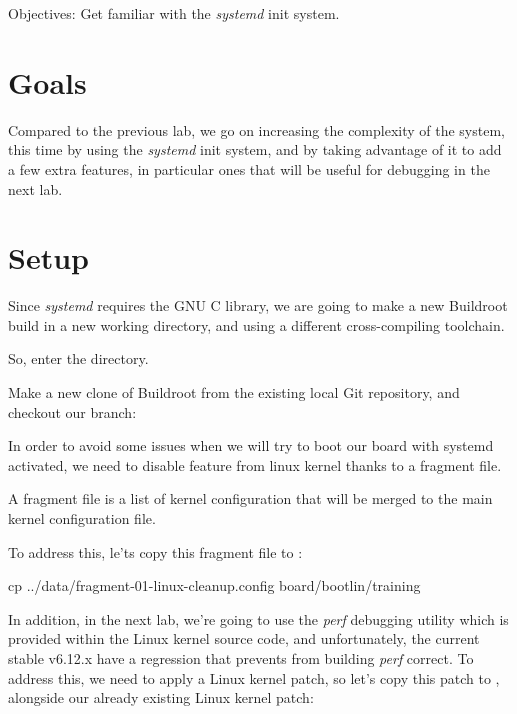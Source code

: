   {Objectives: Get familiar with the {\em systemd} init system.}

\section{Goals}

Compared to the previous lab, we go on increasing the complexity
of the system, this time by using the {\em systemd} init system,
and by taking advantage of it to add a few extra features, in particular
ones that will be useful for debugging in the next lab.

\section{Setup}

Since {\em systemd} requires the GNU C library, we are going
to make a new Buildroot build in a new working directory, and
using a different cross-compiling toolchain.

So, enter the  directory.

Make a new clone of Buildroot from the existing local Git repository,
and checkout our  branch:


\if{}
In order to avoid some issues when we will try to boot our board with
systemd activated, we need to disable  feature from
linux kernel thanks to a fragment file.

A fragment file is a list of kernel configuration that will be merged to the main kernel configuration file.

To address this, le'ts copy this fragment file to :

\begin{bashinput}
cp ../data/fragment-01-linux-cleanup.config board/bootlin/training
\end{bashinput}
\else
In addition, in the next lab, we're going to use the {\em perf}
debugging utility which is provided within the Linux kernel source
code, and unfortunately, the current stable v6.12.x have a regression
that prevents from building {\em perf} correct. To address this, we
need to apply a Linux kernel patch, so let's copy this patch to
, alongside our already existing Linux
kernel patch:

